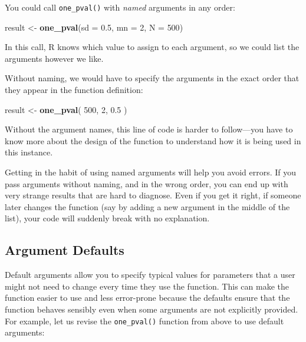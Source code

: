 \documentclass[
]{book}
\newenvironment{Shaded}{\begin{snugshade}}{\end{snugshade}}
\newcommand{\AttributeTok}[1]{\textcolor[rgb]{0.13,0.29,0.53}{#1}}
\newcommand{\DecValTok}[1]{\textcolor[rgb]{0.00,0.00,0.81}{#1}}
\newcommand{\FloatTok}[1]{\textcolor[rgb]{0.00,0.00,0.81}{#1}}
\newcommand{\FunctionTok}[1]{\textcolor[rgb]{0.13,0.29,0.53}{\textbf{#1}}}
\newcommand{\NormalTok}[1]{#1}
\newcommand{\OtherTok}[1]{\textcolor[rgb]{0.56,0.35,0.01}{#1}}
\begin{document}
You could call \texttt{one\_pval()} with \emph{named} arguments in any order:

\begin{Shaded}
\begin{Highlighting}[]
\NormalTok{result }\OtherTok{\textless{}{-}} \FunctionTok{one\_pval}\NormalTok{(}\AttributeTok{sd =} \FloatTok{0.5}\NormalTok{, }\AttributeTok{mn =} \DecValTok{2}\NormalTok{, }\AttributeTok{N =} \DecValTok{500}\NormalTok{)}
\end{Highlighting}
\end{Shaded}

In this call, R knows which value to assign to each argument, so we could list the arguments however we like.

Without naming, we would have to specify the arguments in the exact order that they appear in the function definition:

\begin{Shaded}
\begin{Highlighting}[]
\NormalTok{result }\OtherTok{\textless{}{-}} \FunctionTok{one\_pval}\NormalTok{( }\DecValTok{500}\NormalTok{, }\DecValTok{2}\NormalTok{, }\FloatTok{0.5}\NormalTok{ )}
\end{Highlighting}
\end{Shaded}

Without the argument names, this line of code is harder to follow---you have to know more about the design of the function to understand how it is being used in this instance.

Getting in the habit of using named arguments will help you avoid errors.
If you pass arguments without naming, and in the wrong order, you can end up with very strange results that are hard to diagnose.
Even if you get it right, if someone later changes the function (say by adding a new argument in the middle of the list), your code will suddenly break with no explanation.

\subsection{Argument Defaults}\label{argument-defaults}

Default arguments allow you to specify typical values for parameters that a user might not need to change every time they use the function.
This can make the function easier to use and less error-prone because the defaults ensure that the function behaves sensibly even when some arguments are not explicitly provided. For example, let us revise the \texttt{one\_pval()} function from above to use default arguments:
\end{document}
